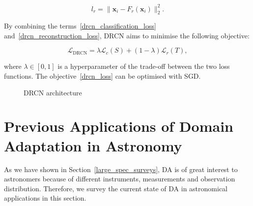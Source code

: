 \begin{equation}
	l_r = \|\mathbf{x}_i - F_r(\mathbf{x}_i)\|_2^2.
\end{equation}

By combining the terms~\ref{drcn_classification_loss} and~\ref{drcn_reconstruction_loss},
DRCN aims to minimise the following objective:

\begin{equation}
	\mathcal{L}_{\mathrm{DRCN}}
	= \lambda \mathcal{L}_c(S) + (1 - \lambda) \mathcal{L}_r(T),
	\label{drcn_loss}
\end{equation}

where \(\lambda \in [0, 1]\) is a hyperparameter of the trade-off between the two loss functions.
The objective~\ref{drcn_loss} can be optimised with SGD.

\begin{figure}
\begin{center}
\end{center}
\caption{DRCN architecture}
\end{figure}

\section{Previous Applications of Domain Adaptation in Astronomy}
\label{da_astronomy}

As we have shown in Section~\ref{large_spec_surveys},
DA is of great interest to astronomers
because of different instruments, measurements and observation distribution.
Therefore, we survey the current state of DA in astronomical applications in this section.

